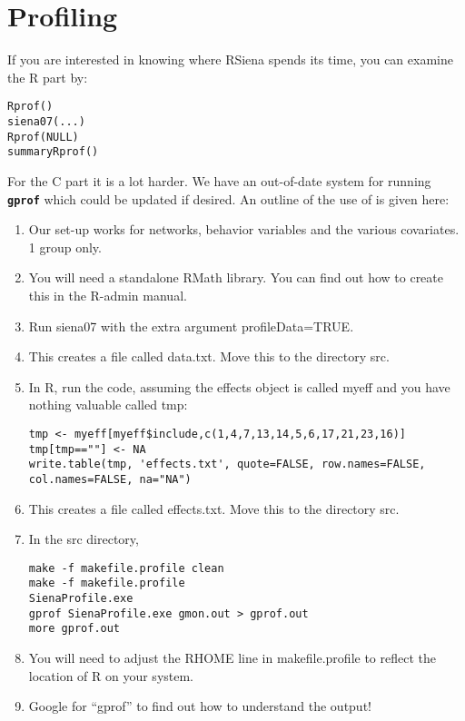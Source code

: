 \documentclass[12pt, a4paper]{article}
\renewcommand{\=}{\,=\,}
\newcommand{\+}{\,+\,}
\newcommand{\sfn}[1]{\textbf{\texttt{#1}}}
\begin{document}
\section{Profiling}
If you are interested in knowing where RSiena spends its time, you can examine
the R part by:
\begin{verbatim}
Rprof()
siena07(...)
Rprof(NULL)
summaryRprof()
\end{verbatim}
For the C part it is a lot harder. We have an out-of-date system for running
\sfn{gprof} which could be updated if desired.  An outline of the use of
is given here:
\begin{enumerate}
\item Our set-up works for networks, behavior variables and the various
  covariates. 1 group only.
\item You will need a standalone RMath library. You can find out how to create
  this in the R-admin manual.
\item Run siena07 with the extra argument \textsf{profileData=TRUE}.
\item This creates a file called \textsf{data.txt}. Move this to the directory
  \textsf{src}.
\item In R, run the code, assuming the effects object is called \textsf{myeff}
  and you have nothing valuable called \textsf{tmp}:
\begin{verbatim}
tmp <- myeff[myeff$include,c(1,4,7,13,14,5,6,17,21,23,16)]
tmp[tmp==""] <- NA
write.table(tmp, 'effects.txt', quote=FALSE, row.names=FALSE,
col.names=FALSE, na="NA")
\end{verbatim}
\item This creates a file called \textsf{effects.txt}.  Move this to the
  directory \textsf{src}.
\item In the \textsf{src} directory,
\begin{verbatim}
make -f makefile.profile clean
make -f makefile.profile
SienaProfile.exe
gprof SienaProfile.exe gmon.out > gprof.out
more gprof.out
\end{verbatim}
\item You will need to adjust the \textsf{RHOME} line in
  \textsf{makefile.profile} to reflect the location of R on your system.
\item Google for ``gprof'' to find out how to understand the output!
\end{enumerate}
\end{document}
